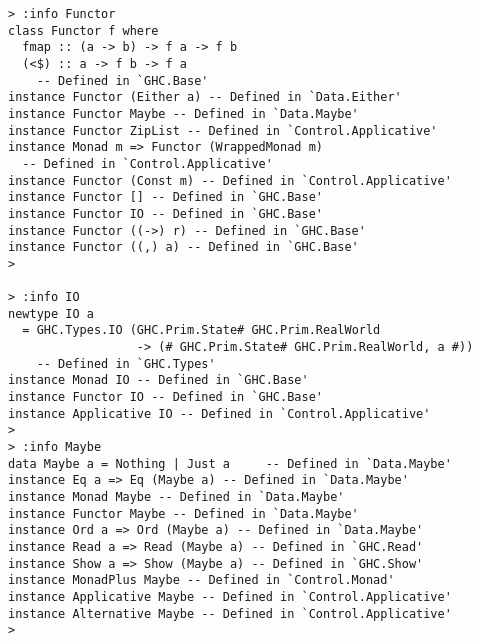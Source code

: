 \documentclass[11pt]{article}
\begin{document}
\begin{verbatim}
> :info Functor 
class Functor f where
  fmap :: (a -> b) -> f a -> f b
  (<$) :: a -> f b -> f a
  	-- Defined in `GHC.Base'
instance Functor (Either a) -- Defined in `Data.Either'
instance Functor Maybe -- Defined in `Data.Maybe'
instance Functor ZipList -- Defined in `Control.Applicative'
instance Monad m => Functor (WrappedMonad m)
  -- Defined in `Control.Applicative'
instance Functor (Const m) -- Defined in `Control.Applicative'
instance Functor [] -- Defined in `GHC.Base'
instance Functor IO -- Defined in `GHC.Base'
instance Functor ((->) r) -- Defined in `GHC.Base'
instance Functor ((,) a) -- Defined in `GHC.Base'
>

> :info IO
newtype IO a
  = GHC.Types.IO (GHC.Prim.State# GHC.Prim.RealWorld
                  -> (# GHC.Prim.State# GHC.Prim.RealWorld, a #))
  	-- Defined in `GHC.Types'
instance Monad IO -- Defined in `GHC.Base'
instance Functor IO -- Defined in `GHC.Base'
instance Applicative IO -- Defined in `Control.Applicative'
> 
> :info Maybe
data Maybe a = Nothing | Just a 	-- Defined in `Data.Maybe'
instance Eq a => Eq (Maybe a) -- Defined in `Data.Maybe'
instance Monad Maybe -- Defined in `Data.Maybe'
instance Functor Maybe -- Defined in `Data.Maybe'
instance Ord a => Ord (Maybe a) -- Defined in `Data.Maybe'
instance Read a => Read (Maybe a) -- Defined in `GHC.Read'
instance Show a => Show (Maybe a) -- Defined in `GHC.Show'
instance MonadPlus Maybe -- Defined in `Control.Monad'
instance Applicative Maybe -- Defined in `Control.Applicative'
instance Alternative Maybe -- Defined in `Control.Applicative'
>
\end{verbatim}
\end{document}
